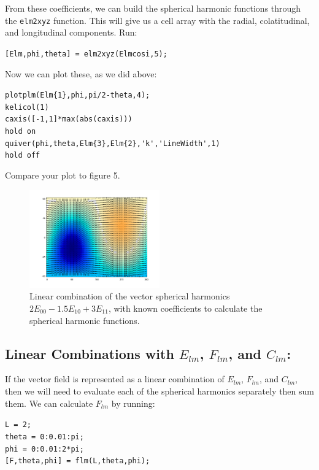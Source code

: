\documentclass[11pt]{article}
\begin{document}
From these coefficients, we can build the spherical harmonic functions through the \verb|elm2xyz| function.  This will give us a cell array with the radial, colatitudinal, and longitudinal components.  Run:

\verb|[Elm,phi,theta] = elm2xyz(Elmcosi,5);|

Now we can plot these, as we did above:

\verb|plotplm(Elm{1},phi,pi/2-theta,4);|\\
\verb|kelicol(1)|\\
\verb|caxis([-1,1]*max(abs(caxis)))|\\
\verb|hold on|\\
\verb|quiver(phi,theta,Elm{3},Elm{2},'k','LineWidth',1)|\\
\verb|hold off|

Compare your plot to figure 5.

\begin{figure}[H]
  \centering
  \includegraphics[width=0.5\textwidth]{figures_Rep2/lincomb2.png}  
  \caption{Linear combination of the vector spherical harmonics $2E_{00}-1.5E_{10}+3E_{11}$, with known coefficients to calculate the spherical harmonic functions.}
\label{E_knowncoeff}
\end{figure}

\subsection{Linear Combinations with $E_{lm}$, $F_{lm}$, and $C_{lm}$:}

If the vector field is represented as a linear combination of $E_{lm}$, $F_{lm}$, and $C_{lm}$, then we will need to evaluate each of the spherical harmonics separately then sum them.  We can calculate $F_{lm}$ by running:

\verb|L = 2;|\\
\verb|theta = 0:0.01:pi;|\\
\verb|phi = 0:0.01:2*pi;|\\
\verb|[F,theta,phi] = flm(L,theta,phi);|
\end{document}
